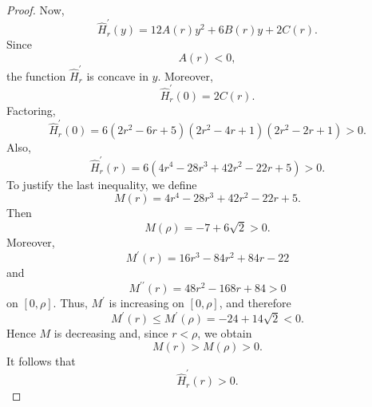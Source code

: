 \documentclass[11pt,a4paper]{article}
\numberwithin{equation}{section}
\numberwithin{table}{section}
\theoremstyle{plain}
\theoremstyle{definition}\newtheorem{definition}[theorem]{Definition}
\theoremstyle{remark}\newtheorem{remark}[theorem]{Remark}
\begin{document}
\begin{proof}
Now, 
\begin{equation*}
\widehat H_r^{\prime}(y)=12A(r)y^2+6B(r)y+2C(r).
\end{equation*}
Since 
\begin{equation*}
A(r)<0,
\end{equation*}
the function $\widehat H_r^{\prime}$ is concave in $y$. Moreover, 
\begin{equation*}
\widehat H_r^{\prime}(0)=2C(r).
\end{equation*}
Factoring, 
\begin{equation*}
\widehat H_r^{\prime}(0)=6(2r^2-6r+5)(2r^2-4r+1)(2r^2-2r+1)>0.
\end{equation*}
Also, 
\begin{equation*}
\widehat H_r^{\prime}(r)=6(4r^4-28r^3+42r^2-22r+5)>0.
\end{equation*}
To justify the last inequality, we define 
\begin{equation*}
M(r)=4r^4-28r^3+42r^2-22r+5.
\end{equation*}
Then 
\begin{equation*}
M(\rho)=-7+6\sqrt2>0.
\end{equation*}
Moreover, 
\begin{equation*}
M^{\prime}(r)=16r^3-84r^2+84r-22
\end{equation*}
and 
\begin{equation*}
M^{\prime\prime}(r)=48r^2-168r+84>0
\end{equation*}
on $[0,\rho]$. Thus, $M^{\prime}$ is increasing on $[0,\rho]$,
and therefore 
\begin{equation*}
M^{\prime}(r)\leq M^{\prime}(\rho)=-24+14\sqrt2<0.
\end{equation*}
Hence $M$ is decreasing and, since $r<\rho$, we obtain 
\begin{equation*}
M(r)>M(\rho)>0.
\end{equation*}
It follows that 
\begin{equation*}
\widehat H_r^{\prime}(r)>0.
\end{equation*}


\end{proof}
\end{document}
